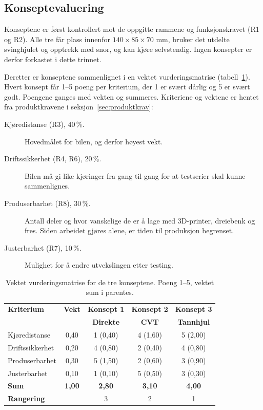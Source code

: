 \subsection{Konseptevaluering}
\label{sec:konseptevaluering}
Konseptene er først kontrollert mot de oppgitte rammene og funksjonskravet (R1 og R2). Alle tre får plass innenfor $140 \times 85 \times 70$ mm, bruker det utdelte svinghjulet og opptrekk med snor, og kan kjøre selvstendig. Ingen konsepter er derfor forkastet i dette trinnet.

Deretter er konseptene sammenlignet i en vektet vurderingsmatrise (tabell~\ref{tab:vurderingsmatrise}). Hvert konsept får 1--5 poeng per kriterium, der 1 er svært dårlig og 5 er svært godt. Poengene ganges med vekten og summeres. Kriteriene og vektene er hentet fra produktkravene i seksjon~\ref{sec:produktkrav}:
\begin{description}
    \item[Kjøredistanse (R3), 40\,\%.] Hovedmålet for bilen, og derfor høyest vekt.
    \item[Driftssikkerhet (R4, R6), 20\,\%.] Bilen må gi like kjøringer fra gang til gang for at testserier skal kunne sammenlignes.
    \item[Produserbarhet (R8), 30\,\%.] Antall deler og hvor vanskelige de er å lage med 3D-printer, dreiebenk og fres. Siden arbeidet gjøres alene, er tiden til produksjon begrenset.
    \item[Justerbarhet (R7), 10\,\%.] Mulighet for å endre utvekslingen etter testing.
\end{description}

\begin{table}[H]
    \centering
    \caption[Vektet vurderingsmatrise]{Vektet vurderingsmatrise for de tre konseptene. Poeng 1--5, vektet sum i parentes.}
    \label{tab:vurderingsmatrise}
    \small
    \renewcommand{\arraystretch}{1.3}
    \begin{tabular}{|l|c|c|c|c|}
        \hline
        \textbf{Kriterium} & \textbf{Vekt} & \textbf{Konsept 1} & \textbf{Konsept 2} & \textbf{Konsept 3} \\
         & & \textbf{Direkte} & \textbf{CVT} & \textbf{Tannhjul} \\
        \hline
        Kjøredistanse & 0,40 & 1 (0,40) & 4 (1,60) & 5 (2,00) \\
        \hline
        Driftssikkerhet & 0,20 & 4 (0,80) & 2 (0,40) & 4 (0,80) \\
        \hline
        Produserbarhet & 0,30 & 5 (1,50) & 2 (0,60) & 3 (0,90) \\
        \hline
        Justerbarhet & 0,10 & 1 (0,10) & 5 (0,50) & 3 (0,30) \\
        \hline
        \textbf{Sum} & \textbf{1,00} & \textbf{2,80} & \textbf{3,10} & \textbf{4,00} \\
        \hline
        \textbf{Rangering} & & 3 & 2 & 1 \\
        \hline
    \end{tabular}
\end{table}

